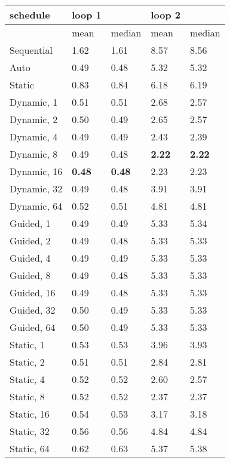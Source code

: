\begin{tabu}{l|ll|ll}
schedule &loop 1 &&loop 2 \\
\hline
&mean &median &mean &median \\
\hline
Sequential&1.62 &1.61 &8.57 &8.56\\
Auto&0.49 &0.48 &5.32 &5.32\\
Static&0.83 &0.84 &6.18 &6.19\\
Dynamic, 1&0.51 &0.51 &2.68 &2.57\\
Dynamic, 2&0.50 &0.49 &2.65 &2.57\\
Dynamic, 4&0.49 &0.49 &2.43 &2.39\\
Dynamic, 8&0.49 &0.48 &\textbf{2.22} &\textbf{2.22}\\
Dynamic, 16&\textbf{0.48} &\textbf{0.48} &2.23 &2.23\\
Dynamic, 32&0.49 &0.48 &3.91 &3.91\\
Dynamic, 64&0.52 &0.51 &4.81 &4.81\\
Guided, 1&0.49 &0.49 &5.33 &5.34\\
Guided, 2&0.49 &0.48 &5.33 &5.33\\
Guided, 4&0.49 &0.49 &5.33 &5.33\\
Guided, 8&0.49 &0.48 &5.33 &5.33\\
Guided, 16&0.49 &0.48 &5.33 &5.33\\
Guided, 32&0.50 &0.49 &5.33 &5.33\\
Guided, 64&0.50 &0.49 &5.33 &5.33\\
Static, 1&0.53 &0.53 &3.96 &3.93\\
Static, 2&0.51 &0.51 &2.84 &2.81\\
Static, 4&0.52 &0.52 &2.60 &2.57\\
Static, 8&0.52 &0.52 &2.37 &2.37\\
Static, 16&0.54 &0.53 &3.17 &3.18\\
Static, 32&0.56 &0.56 &4.84 &4.84\\
Static, 64&0.62 &0.63 &5.37 &5.38\\
\end{tabu}
